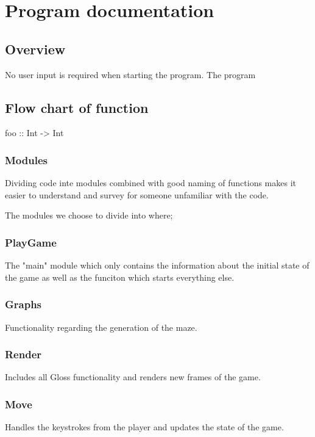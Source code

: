 \documentclass[12pt, a4paper]{article}
\begin{document}
\newpage
\section{Program documentation}

\subsection{Overview}
No user input is required when starting the program. The program 

\subsection{Flow chart of function}
\begin{code}
    foo :: Int -> Int
\end{code}

\subsubsection{Modules}
Dividing code inte modules combined with good naming of functions makes it easier to understand and survey for someone unfamiliar with the code.

The modules we choose to divide into where;

\subsubsection{PlayGame}
The "main" module which only contains the information about the initial state of the game as well as the funciton which starts everything else.

\subsubsection{Graphs}
Functionality regarding the generation of the maze.


\subsubsection{Render}

Includes all Gloss functionality and renders new frames of the game.

\subsubsection{Move}
Handles the keystrokes from the player and updates the state of the game.
\end{document}
